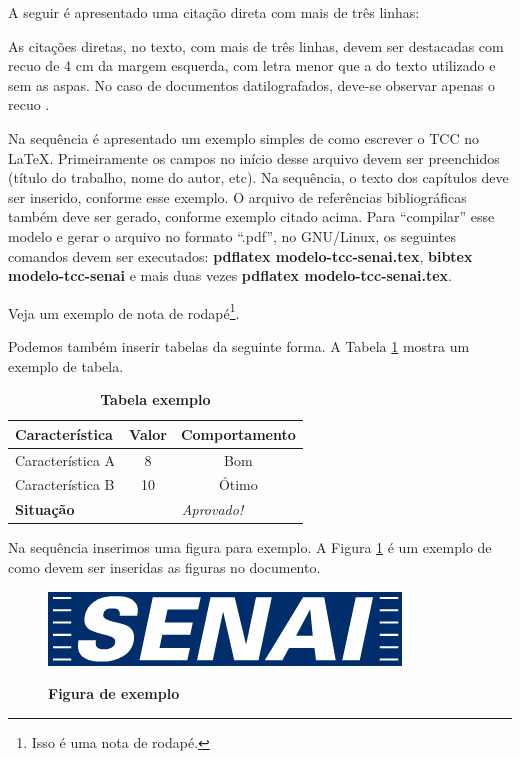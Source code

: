 \documentclass[
	12pt,				%
	openright,			%
	oneside,			%
	a4paper,			%
	chapter=TITLE,		%
	section=TITLE,		%
	brazil				%
	]{abntex2}
\begin{document}
A seguir é apresentado uma citação direta com mais de três linhas:

\begin{citacao}
As citações diretas, no texto, com mais de três linhas, devem ser destacadas com recuo de 4 cm da margem esquerda, com letra menor que a do texto utilizado e sem as aspas. No caso de documentos datilografados, deve-se observar apenas o recuo \cite[p. 10]{NBR10520:2002}.
\end{citacao}

Na sequência é apresentado um exemplo simples de como escrever o TCC no \LaTeX. Primeiramente os campos no início desse arquivo devem ser preenchidos (título do trabalho, nome do autor, etc). Na sequência, o texto dos capítulos deve ser inserido, conforme esse exemplo. O arquivo de referências bibliográficas também deve ser gerado, conforme exemplo citado acima. Para ``compilar'' esse modelo e gerar o arquivo no formato ``.pdf'', no GNU/Linux, os seguintes comandos devem ser executados: \textbf{pdflatex modelo-tcc-senai.tex}, \textbf{bibtex modelo-tcc-senai} e mais duas vezes \textbf{pdflatex modelo-tcc-senai.tex}. 

Veja um exemplo de nota de rodapé\footnote{Isso é uma nota de rodapé.}.

Podemos também inserir tabelas da seguinte forma. A Tabela \ref{tab-exemplo} mostra um exemplo de tabela.

\begin{table}[h!]
\center\scriptsize
\caption{\textbf{Tabela exemplo}}
\begin{tabular}{|l|c|c|} \hline \label{tab-exemplo}
\textbf{ Característica}	& \textbf{Valor} 	& \textbf{ Comportamento} \\ \hline
Característica A 		& 8			& Bom \\ \hline
Característica B		& 10			&Ótimo \\ \hline
\textbf{Situação}		& \multicolumn{2}{c|}{\textit{Aprovado!}} \\ \hline
\end{tabular}
\end{table}

Na sequência inserimos uma figura para exemplo. A Figura \ref{fig-exemplo} é um exemplo de como devem ser inseridas as figuras no documento.

\begin{figure}[htb]
  \begin{center}
    \caption{\textbf{Figura de exemplo}}\label{fig-exemplo}
    \includegraphics [scale=0.6]{logo-senai.jpg}
    \label{fig-exemplo}
  \end{center}
\end{figure}
\end{document}

